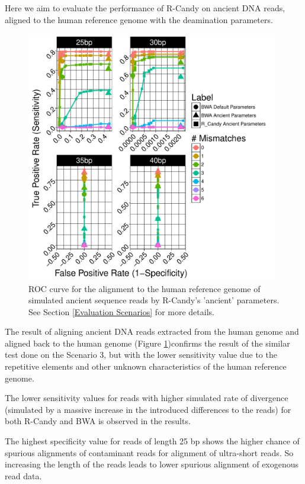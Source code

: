 \documentclass[11pt,a4paper]{report}
\begin{document}
Here we aim to evaluate the performance of R-Candy on ancient DNA reads, 
aligned to the human reference genome with the deamination parameters.


\begin{figure}[H]
\centering
\includegraphics[width=11cm]{pictures/f_DS4_emp.pdf}

\caption{
ROC curve for the alignment to the human reference genome of simulated ancient
sequence reads by R-Candy's 'ancient' parameters. See Section \ref{Evaluation 
Scenarios} for more details. }

\label{DS4_emp}
\end{figure}



The result of aligning ancient DNA reads extracted from the human genome and 
aligned back to the human genome (Figure \ref{DS4_emp})confirms the result of 
the similar test done on the Scenario 3, but with the lower sensitivity value 
due to the repetitive elements and other unknown characteristics of the human 
reference genome.

The lower sensitivity values for reads with higher simulated rate of divergence 
(simulated by a massive increase in the introduced differences to the reads) for
both R-Candy and BWA is observed in the results.

The highest specificity value for reads of length 25 bp shows the higher chance
of spurious alignments of contaminant reads for alignment of ultra-short reads.
So increasing the length of the reads leads to lower spurious alignment of 
exogenous read data.
\end{document}
